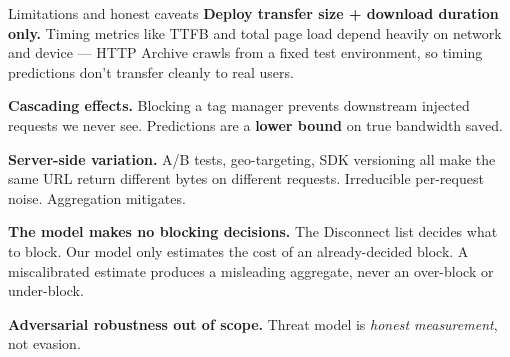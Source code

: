 \documentclass[10pt,aspectratio=169]{beamer}
\begin{document}
\begin{frame}{Limitations and honest caveats}
    \textbf{Deploy transfer size + download duration only.} Timing metrics like TTFB and total page load depend heavily on network and device — HTTP Archive crawls from a fixed test environment, so timing predictions don't transfer cleanly to real users.

    \vspace{0.5em}
    \textbf{Cascading effects.} Blocking a tag manager prevents downstream injected requests we never see. Predictions are a \textbf{lower bound} on true bandwidth saved.

    \vspace{0.5em}
    \textbf{Server-side variation.} A/B tests, geo-targeting, SDK versioning all make the same URL return different bytes on different requests. Irreducible per-request noise. Aggregation mitigates.

    \vspace{0.5em}
    \textbf{The model makes no blocking decisions.} The Disconnect list decides what to block. Our model only estimates the cost of an already-decided block. A miscalibrated estimate produces a misleading aggregate, never an over-block or under-block.

    \vspace{0.5em}
    \textbf{Adversarial robustness out of scope.} Threat model is \textit{honest measurement}, not evasion.
\end{frame}
\end{document}
